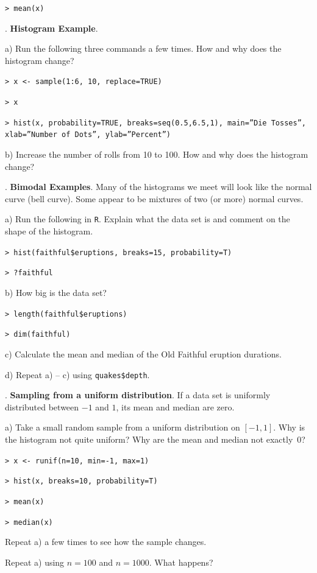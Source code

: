 \documentclass[10pt]{article}
\newcounter{EX}\setcounter{EX}{1}
\newcommand{\EXERCISE}{\arabic{EX}.\stepcounter{EX} }
\begin{document}
\HX\HX \texttt{>  mean(x)}
\smallskip

\EXERCISE \textbf{Histogram Example}.

\HX a) Run the following three commands a few times.  How and why does the histogram change?  


\HX\HX \texttt{>  x <- sample(1:6, 10, replace=TRUE)}

\HX\HX \texttt{>  x}

\HX\HX \texttt{>  hist(x, probability=TRUE, breaks=seq(0.5,6.5,1), main=''Die Tosses'', xlab=''Number of Dots'', ylab=''Percent'')}

\HX  b) Increase the number of rolls from 10 to 100.  How and why does the histogram change?  
\bigskip

\EXERCISE \textbf{Bimodal Examples}. Many of the histograms we meet will look like
the normal curve (bell curve).  Some appear to be mixtures of
two (or more) normal curves.

\HX a) Run the following in \texttt{R}.  Explain what the data set is and comment
on the shape of the histogram.

\HX\HX \texttt{> hist(faithful\$eruptions, breaks=15, probability=T)}

\HX\HX \texttt{> ?faithful}

\HX b) How big is the data set?

\HX\HX \texttt{> length(faithful\$eruptions)}

\HX\HX \texttt{> dim(faithful)}

\HX c) Calculate the mean and median of the Old Faithful eruption durations.

\HX d) Repeat a) -- c) using \texttt{quakes\$depth}.
\vfill
\eject

\EXERCISE \textbf{Sampling from a uniform distribution}.  If a data set
is uniformly distributed between $-1$ and $1$, its mean and median are zero.


\HX a) Take a small random sample from a uniform distribution on $[-1, 1]$.
Why is the histogram not quite uniform?  Why are the mean and median not exactly~$0$?

\HX\HX \texttt{> x <- runif(n=10, min=-1, max=1)}

\HX\HX \texttt{> hist(x, breaks=10, probability=T)}

\HX\HX \texttt{> mean(x)}

\HX\HX \texttt{> median(x)}

\HX Repeat a) a few times to see how the sample changes.

\HX Repeat a) using $n=100$ and $n=1000$.  What happens?
\bigskip
\end{document}
